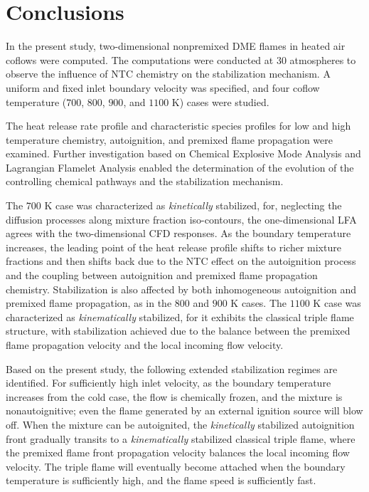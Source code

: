 \documentclass[review,3p,times]{elsarticle}
\begin{document}
\section{Conclusions}

In the present study, two-dimensional nonpremixed DME flames in heated air coflows were computed.  The computations were conducted at $30$ atmospheres to observe the influence of NTC chemistry on the stabilization mechanism.  A uniform and fixed inlet boundary velocity was specified, and four coflow temperature ($700$, $800$, $900$, and $1100$ K) cases were studied.  

The heat release rate profile and characteristic species profiles for low and high temperature chemistry, autoignition, and premixed flame propagation were examined.  Further investigation based on Chemical Explosive Mode Analysis and Lagrangian Flamelet Analysis enabled the determination of the \textcolor{mycolor}{evolution of the controlling chemical pathways and the }stabilization mechanism.  

\textcolor{mycolor}{The $700$ K case was characterized as \emph {kinetically} stabilized, for, neglecting the diffusion processes along mixture fraction iso-contours, the one-dimensional LFA agrees with the two-dimensional CFD responses.  As the boundary temperature increases, the leading point of the heat release profile shifts to richer mixture fractions and then shifts back due to the NTC effect on the autoignition process and the coupling between autoignition and premixed flame propagation chemistry.  Stabilization is also affected by both inhomogeneous autoignition and premixed flame propagation, as in the $800$ and $900$ K cases.  The $1100$ K case was characterized as \emph {kinematically} stabilized, for it exhibits the classical triple flame structure, with stabilization achieved due to the balance between the premixed flame propagation velocity and the local incoming flow velocity.}

Based on the present study, the following extended stabilization regimes are identified.  For sufficiently high inlet velocity, as the boundary temperature increases from the cold case, the flow is chemically frozen, and the mixture is nonautoignitive; even the flame generated by an external ignition source will blow off.  When the mixture can be autoignited, the \emph {kinetically} stabilized autoignition front gradually transits to a \emph {kinematically} stabilized classical triple flame, where the premixed flame front propagation velocity balances the local incoming flow velocity.  The triple flame will eventually become attached when the boundary temperature is sufficiently high, and the flame speed is sufficiently fast.
\end{document}

